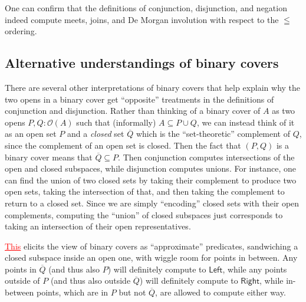 \documentclass[conference]{IEEEtran}
\newcommand{\Open}[1]{\mathcal{O}({#1})}
\newcommand{\grammar}[1]{\textcolor{red}{\underline{#1}}}
\begin{document}
One can confirm that the definitions of conjunction, disjunction, and negation indeed compute meets, joins, and De Morgan involution with respect to the $\leqq$ ordering.

\subsection{Alternative understandings of binary covers}

There are several other interpretations of binary covers that help explain why the two opens in a binary cover get ``opposite'' treatments in the definitions of conjunction and disjunction. Rather than thinking of a binary cover of $A$ as two opens $P, Q : \Open{A}$ such that (informally) $A \subseteq P \cup Q$, we can instead think of it as an open set $P$ and a \emph{closed} set $\overline{Q}$ which is the ``set-theoretic'' complement of $Q$, since the complement of an open set is closed. Then the fact that $(P, Q)$ is a binary cover means that $\overline{Q} \subseteq P$. Then conjunction computes intersections of the open and closed subspaces, while disjunction computes unions.
For instance, one can find the union of two closed sets by taking their complement to produce two open sets, taking the intersection of that, and then taking the complement to return to a closed set. Since we are simply ``encoding'' closed sets with their open complements, computing the ``union'' of closed subspaces just corresponds to taking an intersection of their open representatives.

\grammar{This} elicits the view of binary covers as ``approximate'' predicates, sandwiching a closed subspace inside an open one, with wiggle room for points in between. Any points in $\overline{Q}$ (and thus also $P$) will definitely compute to $\mathsf{Left}$, while any points outside of $P$ (and thus also outside $\overline{Q}$) will definitely compute to $\mathsf{Right}$, while in-between points, which are in $P$ but not $\overline{Q}$, are allowed to compute either way.
\end{document}
